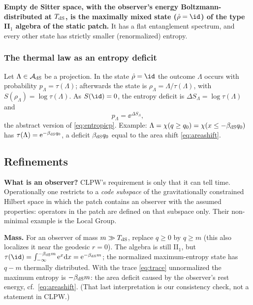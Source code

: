 \begin{keyidea}
\textbf{Empty de Sitter space, with the observer's energy Boltzmann-distributed at $T_{\rm dS}$, is the maximally mixed state ($\hat\rho=\id$) of the type II$_1$ algebra of the static patch.} It has a flat entanglement spectrum, and every other state has strictly smaller (renormalized) entropy.
\end{keyidea}

\subsubsection*{The thermal law as an entropy deficit}
Let $\Lambda\in\mathcal{A}_{\rm dS}$ be a projection. In the state $\hat\rho=\id$ the outcome $\Lambda$ occurs with probability $p_\Lambda=\tau(\Lambda)$; afterwards the state is $\rho_\Lambda=\Lambda/\tau(\Lambda)$, with $S(\rho_\Lambda)=\log\tau(\Lambda)$. As $S(\id)=0$, the entropy deficit is $\Delta S_\Lambda=\log\tau(\Lambda)$ and
\begin{equation}
p_\Lambda=\ee^{\Delta S_\Lambda},\label{eq:pLambda}
\end{equation}
the abstract version of \eqref{eq:entropicp}. Example: $\Lambda=\chi(q\ge q_0)=\chi(x\le-\beta_{\rm dS}q_0)$ has $\tau(\Lambda)=\mathrm{e}^{-\beta_{\rm dS}q_0}$, a deficit $\beta_{\rm dS}q_0$ equal to the area shift \eqref{eq:areashift}.

\subsection{Refinements}

\textbf{What is an observer?} CLPW's requirement is only that it can tell time. Operationally one restricts to a \emph{code subspace} of the gravitationally constrained Hilbert space in which the patch contains an observer with the assumed properties: operators in the patch are defined on that subspace only. Their non-minimal example is the Local Group.

\textbf{Mass.} For an observer of mass $m\gg T_{\rm dS}$, replace $q\ge0$ by $q\ge m$ (this also localizes it near the geodesic $r=0$). The algebra is still II$_1$, but $\tau(\id)=\int_{-\infty}^{-\beta_{\rm dS}m}\ee^x\dd x=\ee^{-\beta_{\rm dS}m}$; the normalized maximum-entropy state has $q-m$ thermally distributed. With the trace \eqref{eq:trace} unnormalized the maximum entropy is $-\beta_{\rm dS}m$: the area deficit caused by the observer's rest energy, cf.\ \eqref{eq:areashift}. (That last interpretation is our consistency check, not a statement in CLPW.)

